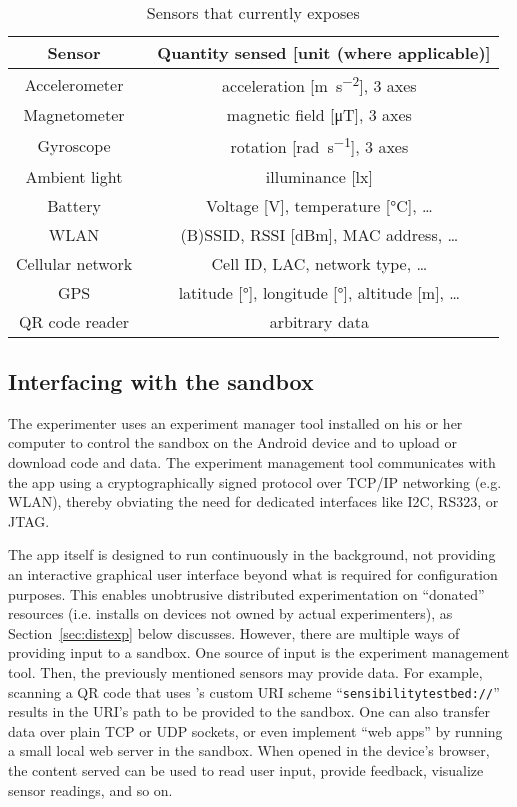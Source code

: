 \begin{table}
\small
\caption{Sensors that \sys currently exposes}\label{tbl:sensors}
\centering
\begin{tabular}{c|c}
\hline
Sensor & Quantity sensed [unit (where applicable)]\\
\hline
\hline
Accelerometer & acceleration [\si{\meter\per\square\second}], 3 axes\\
Magnetometer & magnetic field [\si{\micro\tesla}], 3 axes\\
Gyroscope & rotation [\si{\radian\per\second}], 3 axes\\
Ambient light & illuminance [\si{\lux}]\\
\hline
Battery & Voltage [\si{\volt}], temperature [\si{\degreeCelsius}], \ldots\\
WLAN & (B)SSID, RSSI [\si{dB}m], MAC address, \ldots\\
Cellular network & Cell ID, LAC, network type, \ldots\\
GPS & latitude [\si{\degree}], longitude [\si{\degree}], altitude [\si{\meter}], \ldots\\
\hline
QR code reader & arbitrary data\\
\hline
\end{tabular}
\end{table}


\subsection{Interfacing with the sandbox}
The experimenter uses an experiment manager tool installed on his 
or her computer to control the sandbox on the Android device and to 
upload or download code and data.
The experiment management tool communicates with the app using a 
cryptographically signed protocol over TCP/IP networking (e.g. WLAN), 
thereby obviating the need for dedicated interfaces like I2C, RS323, 
or JTAG.

The \sys app itself is designed to run continuously in the background, 
not providing an interactive graphical user interface beyond what is 
required for configuration purposes. This enables unobtrusive distributed 
experimentation on ``donated'' resources (i.e. installs on devices 
not owned by actual experimenters), as 
Section~\ref{sec:distexp} below discusses. 
However, there are multiple ways of providing input to a sandbox. 
One source of input is the experiment management tool. 
Then, the previously mentioned sensors may provide data. For example, 
scanning a QR code that uses \sys's custom URI scheme 
``\texttt{sensibilitytestbed://}'' results in the URI's path to 
be provided to the sandbox.
One can also transfer data over plain 
TCP or UDP sockets, or even implement ``web apps'' by 
running a small local web server in the sandbox. 
When opened in the device's browser, the content served can be used to 
read user input, provide feedback, visualize sensor readings, and so on.

